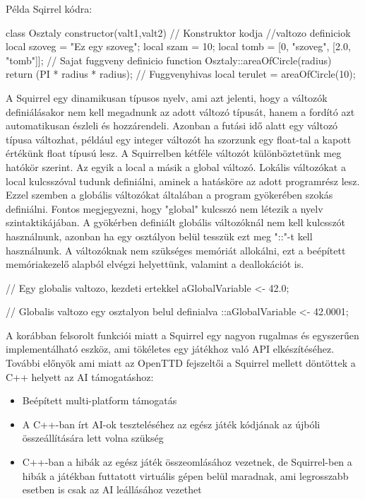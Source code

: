 Példa Sqirrel kódra:

\begin{cpp}
class Osztaly
{	
  constructor(valt1,valt2)
  {
    // Konstruktor kodja
  }
  //valtozo definiciok	
  local szoveg = "Ez egy szoveg"; 
  local szam = 10;
  local tomb = [0, "szoveg", [2.0, "tomb"]];
}
// Sajat fuggveny definicio
function Osztaly::areaOfCircle(radius) {
  return (PI * radius * radius);
}
// Fuggvenyhivas
local terulet = areaOfCircle(10);	
\end{cpp}

A Squirrel egy dinamikusan típusos nyelv, ami azt jelenti, hogy a változók definiálásakor nem kell megadnunk az adott változó típusát, hanem a fordító azt automatikusan észleli és hozzárendeli. Azonban a futási idő alatt egy változó típusa változhat, például egy integer változót ha szorzunk egy float-tal a kapott értékünk float típusú lesz. A Squirrelben kétféle változót különböztetünk meg hatókör szerint. Az egyik a local a másik a global változó. Lokális változókat a local kulcsszóval tudunk definiálni, aminek a hatásköre az adott programrész lesz. Ezzel szemben a globális változókat általában a program gyökerében szokás definiálni. Fontos megjegyezni, hogy "global" kulcsszó nem létezik a nyelv szintaktikájában. A gyökérben definiált globális változóknál nem kell kulcsszót használnunk, azonban ha egy osztályon belül tesszük ezt meg "::"-t kell használnunk. A változóknak nem szükséges memóriát allokálni, ezt a beépített memóriakezelő alapból elvégzi helyettünk, valamint a deallokációt is.

\begin{cpp}
// Egy globalis valtozo, kezdeti ertekkel
aGlobalVariable <- 42.0;

// Globalis valtozo egy osztalyon belul definialva
::aGlobalVariable <- 42.0001;
\end{cpp}

A korábban felsorolt funkciói miatt a Squirrel egy nagyon rugalmas és egyszerűen implementálható eszköz, ami tökéletes egy játékhoz való API elkészítéséhez. További előnyök ami miatt az OpenTTD fejszeltői a Squirrel mellett döntöttek a C++ helyett az AI támogatáshoz:

\begin{itemize}
	\item Beépített multi-platform támogatás
	\item A C++-ban írt AI-ok teszteléséhez az egész játék kódjának az újbóli összeállítására lett volna szükség
	\item C++-ban a hibák az egész játék összeomlásához vezetnek, de Squirrel-ben a hibák a játékban futtatott virtuális gépen belül maradnak, ami legrosszabb esetben is csak az AI leállásához vezethet
\end{itemize}

